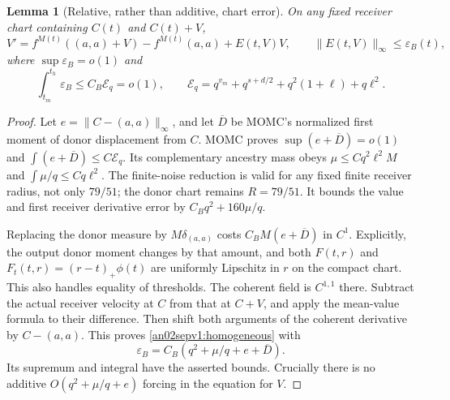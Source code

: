 \documentclass[11pt]{article}
\newtheorem{lemma}[theorem]{Lemma}
\theoremstyle{remark}\newtheorem{remark}[theorem]{Remark}
\begin{document}
\begin{lemma}[Relative, rather than additive, chart error]
\label{an02sepv1:c1}
On any fixed receiver chart containing $C(t)$ and $C(t)+V$,
\begin{equation}
 V'=f^{M(t)}((a,a)+V)-f^{M(t)}(a,a)+E(t,V)V,
 \qquad \|E(t,V)\|_\infty\le\varepsilon_B(t),
 \label{an02sepv1:homogeneous}
\end{equation}
where $\sup\varepsilon_B=o(1)$ and
\begin{equation}
 \int_{t_m}^{t_h}\varepsilon_B\le C_B\mathcal E_q=o(1),\qquad
 \mathcal E_q=q^{v_m}+q^{s+d/2}+q^2(1+\ell)+q\ell^2.
 \label{an02sepv1:error}
\end{equation}
\end{lemma}
\begin{proof}
Let $e=\|C-(a,a)\|_\infty$, and let $\overline D$ be MOMC's
normalized first moment of donor displacement from $C$.
MOMC proves $\sup(e+\overline D)=o(1)$ and
$\int(e+\overline D)\le C\mathcal E_q$.
Its complementary ancestry mass obeys
$\mu\le Cq^2\ell^2M$ and $\int\mu/q\le Cq\ell^2$.
The finite-noise reduction is valid for any fixed finite receiver
radius, not only $79/51$; the donor chart remains $R=79/51$.
It bounds the value and first receiver derivative error by
$C_Bq^2+160\mu/q$.

Replacing the donor measure by $M\delta_{(a,a)}$ costs
$C_B M(e+\overline D)$ in $C^1$. Explicitly, the output donor
moment changes by that amount, and both $F(t,r)$ and
$F_t(t,r)=(r-t)_+\phi(t)$ are uniformly Lipschitz in $r$ on
the compact chart. This also handles equality of thresholds.
The coherent field is $C^{1,1}$ there.
Subtract the actual receiver velocity at $C$ from that at
$C+V$, and apply the mean-value formula to their difference.
Then shift both arguments of the coherent derivative by
$C-(a,a)$. This proves \eqref{an02sepv1:homogeneous} with
\[
 \varepsilon_B=C_B(q^2+\mu/q+e+\overline D).
\]
Its supremum and integral have the asserted bounds. Crucially
there is no additive $O(q^2+\mu/q+e)$ forcing in the equation
for $V$.
\end{proof}
\end{document}
